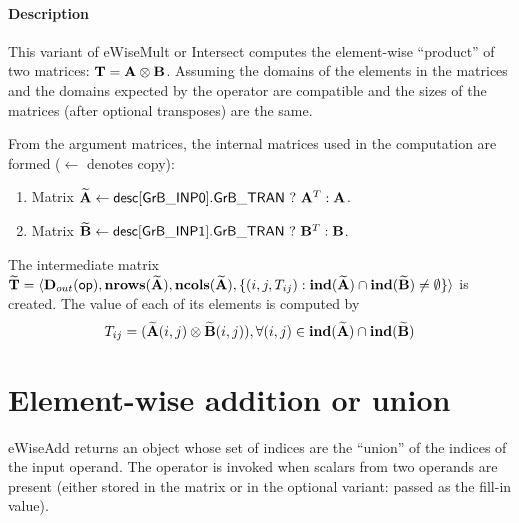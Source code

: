 \paragraph{Description}

This variant of {\sf eWiseMult} or {\sf Intersect} computes the element-wise ``product'' of
two matrices: ${\bf T} = {\bf A} \otimes {\bf B}$.  Assuming the domains of the
elements in the matrices and the domains expected by the operator are compatible
and the sizes of the matrices (after optional transposes) are the same.

From the argument matrices, the internal matrices used in 
the computation are formed ($\leftarrow$ denotes copy): 
\begin{enumerate}
	\item Matrix ${\bf \widetilde{A}} \leftarrow
    {\sf desc[GrB\_INP0].GrB\_TRAN} \ ? \ {\bf A}^T : {\bf A}$.

	\item Matrix ${\bf \widetilde{B}} \leftarrow
    {\sf desc[GrB\_INP1].GrB\_TRAN} \ ? \ {\bf B}^T : {\bf B}$.
\end{enumerate}

The intermediate matrix ${\bf \widetilde{T}} = \langle
\mbox{$\mathbf{D}_{out}$}({\sf op}), \bold{nrows}({\bf \widetilde{A}}), \bold{ncols}({\bf \widetilde{A}}),
\{(i,j,T_{ij}) : \bold{ind}({\bf \widetilde{A}}) \cap 
\bold{ind}({\bf \widetilde{B}}) \neq \emptyset \} \rangle$
is created.  The value of each of its elements is computed by 
\[T_{ij} = ({\bf \widetilde{A}}(i,j)
\otimes {\bf \widetilde{B}}(i,j)), \forall (i,j) \in 
\bold{ind}({\bf \widetilde{A}}) \cap 
\bold{ind}({\bf \widetilde{B}})\]

\section{Element-wise addition or union}

{\sf eWiseAdd} returns an object whose set of indices are the ``union'' of the 
indices of the input operand. The operator is invoked when scalars from two 
operands are present (either stored in the matrix or in the optional variant: 
passed as the fill-in value).


